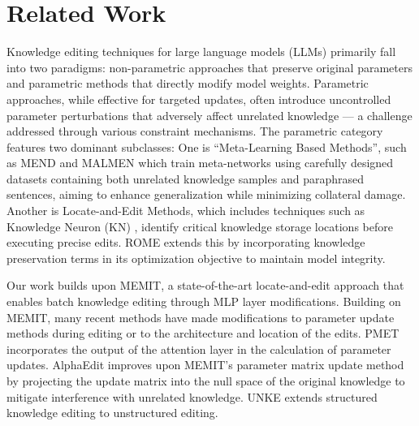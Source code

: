 \section{Related Work}
\label{sec:appendix_related_work}


Knowledge editing techniques for large language models (LLMs) primarily fall into two paradigms: non-parametric approaches that preserve original parameters and parametric methods that directly modify model weights. Parametric approaches, while effective for targeted updates, often introduce uncontrolled parameter perturbations that adversely affect unrelated knowledge --- a challenge addressed through various constraint mechanisms.
The parametric category features two dominant subclasses: One is ``Meta-Learning Based Methods'', such as MEND \cite{DBLP:conf/iclr/MitchellLBFM22} and MALMEN \cite{DBLP:conf/iclr/TanZF24} which train meta-networks using carefully designed datasets containing both unrelated knowledge samples and paraphrased sentences, aiming to enhance generalization while minimizing collateral damage. Another is Locate-and-Edit Methods, which includes techniques such as Knowledge Neuron (KN) \cite{DBLP:conf/acl/DaiDHSCW22}, identify critical knowledge storage locations before executing precise edits. ROME \cite{DBLP:conf/nips/MengBAB22} extends this by incorporating knowledge preservation terms in its optimization objective to maintain model integrity.

Our work builds upon MEMIT, a state-of-the-art locate-and-edit approach that enables batch knowledge editing through MLP layer modifications. Building on MEMIT, many recent methods have made modifications to parameter update methods during editing or to the architecture and location of the edits. PMET \cite{DBLP:conf/aaai/Li0SYMY24} incorporates the output of the attention layer in the calculation of parameter updates. AlphaEdit \cite{fang_alphaedit_2024} improves upon MEMIT's parameter matrix update method by projecting the update matrix into the null space of the original knowledge to mitigate interference with unrelated knowledge. UNKE \cite{deng_unke_2024} extends structured knowledge editing to unstructured editing.